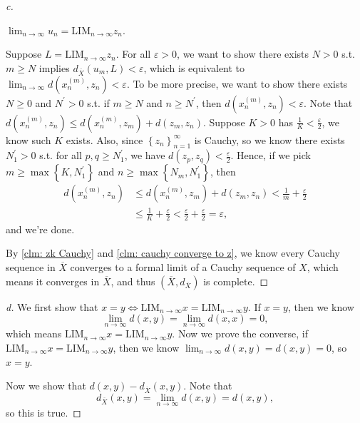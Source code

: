 \begin{proof}[c]
  \begin{claim} \label{clm: cauchy converge to z}
    \(\lim_{n \to \infty} u_n = \mathrm{LIM}_{n \to \infty } z_n\). 
  \end{claim}
  \begin{explanation}
    Suppose \(L = \mathrm{LIM}_{n \to \infty } z_n \). For all \(\varepsilon > 0\), we want to show there exists \(N > 0\) s.t. \(m \ge N\) implies \(d_{\overline{X} }\left( u_m, L \right) < \varepsilon  \), which is equivalent to \(\lim_{n \to \infty} d\left( x_n^{(m)}, z_n \right) < \varepsilon   \). To be more precise, we want to show there exists \(N \ge 0\) and \(N^{\prime} > 0\) s.t. if \(m \ge N\) and \(n \ge N^{\prime} \), then \(d\left( x_n^{(m)}, z_n \right) < \varepsilon  \). Note that \(d\left( x_n^{(m)}, z_n \right) \le d\left( x_n^{(m)}, z_m \right) + d(z_m, z_n)  \). Suppose \(K > 0\) has \(\frac{1}{K} < \frac{\varepsilon}{2}\), we know such \(K\) exists. Also, since \(\left\{ z_n \right\}_{n=1}^{\infty}  \) is Cauchy, so we know there exists \(N_1^{\prime} > 0\) s.t. for all \(p, q \ge N_1^{\prime} \), we have \(d\left( z_p, z_q \right) < \frac{\varepsilon}{2} \). Hence, if we pick \(m \ge \max \left\{ K, N_1^{\prime}  \right\} \) and \(n \ge \max \left\{ N_m, N_1^{\prime}  \right\} \), then 
    \begin{align*}
      d\left( x_n^{(m)}, z_n \right) &\le d\left( x_n^{(m)}, z_m \right) + d(z_m, z_n) < \frac{1}{m} + \frac{\varepsilon}{2} \\
      &\le \frac{1}{K} + \frac{\varepsilon}{2} < \frac{\varepsilon}{2} + \frac{\varepsilon}{2} = \varepsilon ,
    \end{align*}
    and we're done.           
  \end{explanation}
  By \autoref{clm: zk Cauchy} and \autoref{clm: cauchy converge to z}, we know every Cauchy sequence in \(\overline{X} \) converges to a formal limit of a Cauchy sequence of \(X\), which means it converges in \(\overline{X} \), and thus \(\left( \overline{X}, d_{\overline{X} }  \right) \) is complete.
\end{proof}

\begin{proof}[d]
  We first show that \(x = y \iff \mathrm{LIM}_{n \to \infty } x = \mathrm{LIM}_{n \to \infty } y  \). If \(x = y\), then we know 
  \[
    \lim_{n \to \infty} d(x, y) = \lim_{n \to \infty} d(x, x) = 0,  
  \]  which means \(\mathrm{LIM}_{n \to  \infty } x = \mathrm{LIM}_{n \to \infty }y  \). Now we prove the converse, if \(\mathrm{LIM}_{n \to \infty } x = \mathrm{LIM}_{n \to \infty } y  \), then we know \(\lim_{n \to \infty} d(x, y) = d(x, y) = 0 \), so \(x = y\). 
  
  Now we show that \(d(x, y) - d_{\overline{X} }(x, y)\). Note that 
  \[
    d_{\overline{X} }(x, y) = \lim_{n \to \infty} d(x, y) = d(x, y), 
  \] so this is true.
\end{proof}

